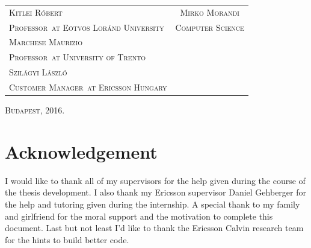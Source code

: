 \documentclass[a4paper,11pt]{report} %
\theoremstyle{change}
\theoremstyle{theoremstyle}
\def\myauthor{Mirko Morandi} %
\def\myacdsup{Kitlei Róbert} %
\def\myacdsuptit{Professor}%
\def\myacdsupen{Marchese Maurizio} %
\def\myacdsupentit{Professor}%
\def\myentryuni{University of Trento}%
\def\myindsup{Szilágyi László}%
\def\myindsuptit{Customer Manager}%
\def\myindcom{Ericsson Hungary}%
\def\currentyear{2016.}%
\begin{document}
\begin{titlepage}
\vspace{4cm}

\begin{tabular}{p{9cm}c}

{\fontsize{14}{10} \scshape \myacdsup} & {\fontsize{14}{10} \scshape \myauthor}\\

{\fontsize{10.5}{20} \scshape \myacdsuptit \ at Eötvös Loránd University }\quad & {\fontsize{10.5}{20} \scshape Computer Science}\\
{\fontsize{14}{20} \scshape \myacdsupen}&\\

{\fontsize{10.5}{20} \scshape \myacdsupentit \ at \myentryuni}&\\

{\fontsize{14}{20} \scshape \myindsup}&\\

{\fontsize{10.5}{20} \scshape \myindsuptit \ at \myindcom}&\\
\end{tabular}

\vspace{3cm}
\begin{center}
{\large \scshape Budapest, \currentyear \\}
\end{center}
\end{titlepage}





\chapter*{Acknowledgement}
I would like to thank all of my supervisors for the help given during the course
of the thesis development. I also thank my Ericsson supervisor Daniel Gehberger for
the help and tutoring given during the internship. A special thank to my family and
girlfriend for the moral support and the motivation to complete this document. Last but
not least I'd like to thank the Ericsson Calvin research team for the hints to build
better code.

\tableofcontents
\listoffigures
\listoftables
\newpage
\leavevmode\thispagestyle{empty}\newpage









%





\end{document}
